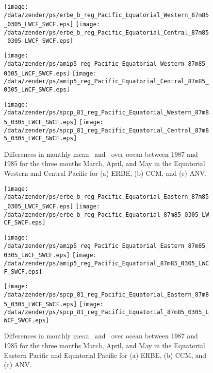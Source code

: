 \documentclass[agupp]{aguplus}
\begin{document}
\begin{figure*}
\texttt{[image: /data/zender/ps/erbe\_b\_reg\_Pacific\_Equatorial\_Western\_87m85\_0305\_LWCF\_SWCF.eps]}
\texttt{[image: /data/zender/ps/erbe\_b\_reg\_Pacific\_Equatorial\_Central\_87m85\_0305\_LWCF\_SWCF.eps]}

\texttt{[image: /data/zender/ps/amip5\_reg\_Pacific\_Equatorial\_Western\_87m85\_0305\_LWCF\_SWCF.eps]}
\texttt{[image: /data/zender/ps/amip5\_reg\_Pacific\_Equatorial\_Central\_87m85\_0305\_LWCF\_SWCF.eps]}

\texttt{[image: /data/zender/ps/spcp\_81\_reg\_Pacific\_Equatorial\_Western\_87m85\_0305\_LWCF\_SWCF.eps]}
\texttt{[image: /data/zender/ps/spcp\_81\_reg\_Pacific\_Equatorial\_Central\_87m85\_0305\_LWCF\_SWCF.eps]}
\caption{Differences in monthly mean \LWCF\ and \SWCF\ over ocean between 1987
and 1985 for the three months March, April, and May in the Equatorial
Western and Central Pacific for (a) ERBE, (b) CCM, and
(c) ANV.
\label{fig:reg_Pacific_Equatorial_87m85_0305_LWCF_SWCF_a}}   
\end{figure*}

\begin{figure*}
\texttt{[image: /data/zender/ps/erbe\_b\_reg\_Pacific\_Equatorial\_Eastern\_87m85\_0305\_LWCF\_SWCF.eps]}
\texttt{[image: /data/zender/ps/erbe\_b\_reg\_Pacific\_Equatorial\_87m85\_0305\_LWCF\_SWCF.eps]}

\texttt{[image: /data/zender/ps/amip5\_reg\_Pacific\_Equatorial\_Eastern\_87m85\_0305\_LWCF\_SWCF.eps]}
\texttt{[image: /data/zender/ps/amip5\_reg\_Pacific\_Equatorial\_87m85\_0305\_LWCF\_SWCF.eps]}

\texttt{[image: /data/zender/ps/spcp\_81\_reg\_Pacific\_Equatorial\_Eastern\_87m85\_0305\_LWCF\_SWCF.eps]}
\texttt{[image: /data/zender/ps/spcp\_81\_reg\_Pacific\_Equatorial\_87m85\_0305\_LWCF\_SWCF.eps]}
\caption{Differences in monthly mean \LWCF\ and \SWCF\ over ocean between 1987
and 1985 for the three months March, April, and May in the Equatorial
Eastern Pacific and Equatorial Pacific for (a) ERBE, (b) CCM, and (c)
ANV. 
\label{fig:reg_Pacific_Equatorial_87m85_0305_LWCF_SWCF_b}}   
\end{figure*}
\end{document}

